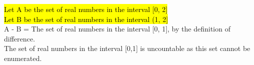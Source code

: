 \documentclass[a4paper, 12pt]{article}
\begin{document}
\hl{Let A be the set of real numbers in the interval [0, 2]\\
Let B be the set of real numbers in the interval (1, 2]}\\

A - B = The set of real numbers in the interval [0, 1], by the definition of difference.\\

The set of real numbers in the interval [0,1] is uncountable as this set cannot be enumerated.\\

\smiley{}
\end{document}

